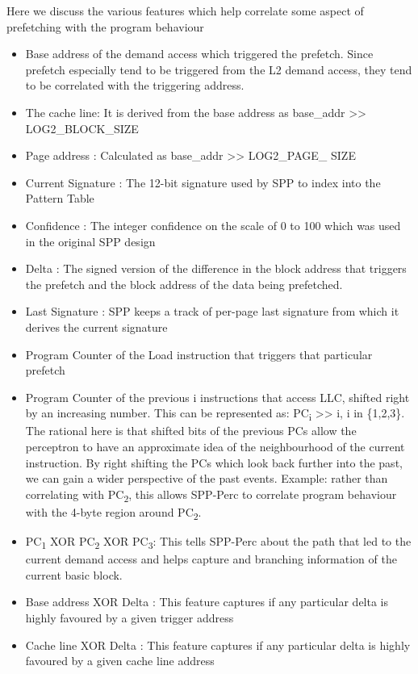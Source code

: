 \documentclass{sig-alternate}
\begin{document}
Here we discuss the various features which help correlate some aspect of prefetching with the program behaviour
\begin{itemize}
\item Base address of the demand access which triggered the prefetch. 
Since prefetch especially tend to be triggered from the L2 demand access, they tend to be correlated with the triggering address.
\item The cache line: It is derived from the base address as base\_addr >> LOG2\_BLOCK\_SIZE
\item Page address : Calculated as base\_addr >> LOG2\_PAGE\_ SIZE
\item Current Signature : The 12-bit signature used by SPP to index into the Pattern Table
\item Confidence : The integer confidence on the scale of 0 to 100 which was used in the original SPP design
\item Delta : The signed version of the difference in the block address that triggers the prefetch and the block address of the data being prefetched.
\item Last Signature : SPP keeps a track of per-page last signature from which it derives the current signature
\item Program Counter of the Load instruction that triggers that particular prefetch
\item Program Counter of the previous i instructions that access LLC, shifted right by an increasing number. 
This can be represented as: PC\textsubscript{i} >> i, i in \{1,2,3\}. 
The rational here is that shifted bits of the previous PCs allow the perceptron to have an approximate idea of the neighbourhood of the current instruction. 
By right shifting the PCs which look back further into the past, we can gain a wider perspective of the past events. 
Example: rather than correlating with PC\textsubscript{2}, this allows SPP-Perc to correlate program behaviour with the 4-byte region around PC\textsubscript{2}.
\item PC\textsubscript{1} XOR PC\textsubscript{2} XOR PC\textsubscript{3}: This tells SPP-Perc about the path that led to the current demand access and helps capture and branching information of the current basic block.
\item Base address XOR Delta : This feature captures if any particular delta is highly favoured by a given trigger address
\item Cache line XOR Delta : This feature captures if any particular delta is highly favoured by a given cache line address

\end{itemize}
\end{document}
